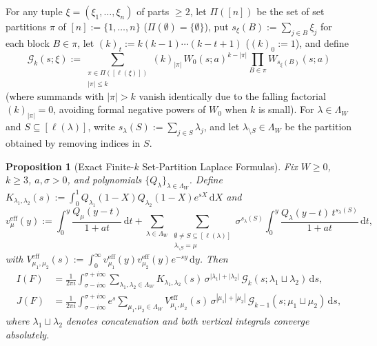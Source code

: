 \documentclass[11pt, reqno]{amsart}
\newtheorem{proposition}[lemma]{Proposition}
\theoremstyle{remark}
\numberwithin{equation}{section}
\newcommand{\cG}{\mathcal{G}}
\newcommand{\dd}{\,\mathrm{d}}
\begin{document}
For any tuple $\xi = (\xi_1, \dots, \xi_n)$ of parts $\ge 2$, let $\Pi([n])$ be the set of set partitions
$\pi$ of $[n] := \{1,\dots,n\}$ ($\Pi(\emptyset) = \{\emptyset\}$), put $s_\xi(B) := \sum_{j \in B} \xi_j$
for each block $B \in \pi$, let $(k)_t := k(k-1)\cdots(k-t+1)$ ($(k)_0 := 1$), and define
\begin{equation}\label{eq:Gk-def}
\cG_k(s; \xi) := \sum_{\substack{\pi \in \Pi([\ell(\xi)]) \\ |\pi| \le k}} (k)_{|\pi|}\,
W_0(s; a)^{k - |\pi|} \prod_{B \in \pi} W_{s_\xi(B)}(s; a)
\end{equation}
(where summands with $|\pi| > k$ vanish identically due to the falling factorial $(k)_{|\pi|} = 0$,
avoiding formal negative powers of $W_0$ when $k$ is small).
For $\lambda \in \Lambda_W$ and $S \subseteq [\ell(\lambda)]$, write $s_\lambda(S) := \sum_{j \in S} \lambda_j$,
and let $\lambda_{\setminus S} \in \Lambda_W$ be the partition obtained by removing indices in $S$.

\begin{proposition}[Exact Finite-$k$ Set-Partition Laplace Formulas]\label{prop:exact-laplace}
Fix $W \ge 0$, $k \ge 3$, $a, \sigma > 0$, and polynomials $\{Q_\lambda\}_{\lambda \in \Lambda_W}$.
Define $K_{\lambda_1,\lambda_2}(s) := \int_0^1 Q_{\lambda_1}(1-X) Q_{\lambda_2}(1-X) e^{sX}\dd X$ and
\begin{equation}\label{eq:v-eff-def}
v_\mu^{\mathrm{eff}}(y) := \int_0^y \frac{Q_\mu(y-t)}{1+at}\dd t
+ \sum_{\lambda \in \Lambda_W}\sum_{\substack{\emptyset \neq S \subseteq [\ell(\lambda)] \\ \lambda_{\setminus S} = \mu}}
\sigma^{s_\lambda(S)} \int_0^y \frac{Q_\lambda(y-t)\, t^{s_\lambda(S)}}{1+at}\dd t,
\end{equation}
with $V_{\mu_1,\mu_2}^{\mathrm{eff}}(s) := \int_0^\infty v_{\mu_1}^{\mathrm{eff}}(y) v_{\mu_2}^{\mathrm{eff}}(y) e^{-sy}\dd y$.
Then
\begin{align}
I(F) &= \frac{1}{2\pi i}\int_{\sigma-i\infty}^{\sigma+i\infty}
\sum_{\lambda_1,\lambda_2 \in \Lambda_W} K_{\lambda_1,\lambda_2}(s)\,
\sigma^{|\lambda_1|+|\lambda_2|} \, \cG_k(s; \lambda_1 \sqcup \lambda_2)\dd s,
\label{eq:I-exact-laplace}\\
J(F) &= \frac{1}{2\pi i}\int_{\sigma-i\infty}^{\sigma+i\infty}
e^s \sum_{\mu_1,\mu_2 \in \Lambda_W} V_{\mu_1,\mu_2}^{\mathrm{eff}}(s)\,
\sigma^{|\mu_1|+|\mu_2|} \, \cG_{k-1}(s; \mu_1 \sqcup \mu_2)\dd s,
\label{eq:J-exact-laplace}
\end{align}
where $\lambda_1 \sqcup \lambda_2$ denotes concatenation and both vertical integrals converge absolutely.
\end{proposition}
\end{document}
